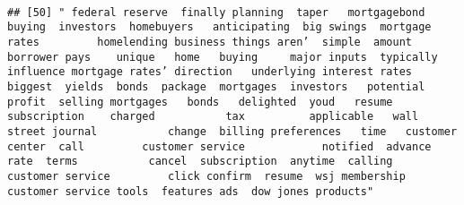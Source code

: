 \documentclass[
]{article}
\begin{document}
\begin{verbatim}
                                                                                                                                                                                                                                                                                                                                                                                                                                                                   
## [50] " federal reserve  finally planning  taper   mortgagebond buying  investors  homebuyers   anticipating  big swings  mortgage rates         homelending business things aren’  simple  amount   borrower pays    unique   home   buying     major inputs  typically influence mortgage rates’ direction   underlying interest rates    biggest  yields  bonds  package  mortgages  investors   potential profit  selling mortgages   bonds   delighted  youd   resume  subscription    charged           tax          applicable   wall street journal           change  billing preferences   time   customer center  call         customer service            notified  advance     rate  terms           cancel  subscription  anytime  calling         customer service         click confirm  resume  wsj membership customer service tools  features ads  dow jones products"                                                                                                                                                                                                                                                                                                                                                                                                                                                                                                                                                                                                                                                                                                                                                                                                                                                                                                                                                                                                                                                                                                                                                                                                                                                                                                                                                                                                                                                                                                                                                                                                                                                                                                                                                                                                                                                                                                                                                                                                                                                                                         
\end{verbatim}
\end{document}
